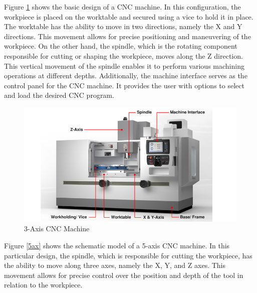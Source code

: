 Figure \ref{3ax} shows the basic design of a \acrshort{CNC} machine. In this configuration, the workpiece is placed on the worktable and secured using a vice to hold it in place. The worktable has the ability to move in two directions, namely the X and Y directions. This movement allows for precise positioning and maneuvering of the workpiece. On the other hand, the spindle, which is the rotating component responsible for cutting or shaping the workpiece, moves along the Z direction. This vertical movement of the spindle enables it to perform various machining operations at different depths. Additionally, the machine interface serves as the control panel for the \acrshort{CNC} machine. It provides the user with options to select and load the desired \acrshort{CNC} program. %




 
\begin{figure}[H]
	\centerline{\includegraphics[scale=.6]{figures/basicCNC.jpg}}
	\caption{3-Axis CNC Machine~\cite{3ax}}
	\label{3ax}
\end{figure}
\newpage


Figure \ref{5ax} shows the schematic model of a 5-axis \acrshort{CNC} machine. In this particular design, the spindle, which is responsible for cutting the workpiece, has the ability to move along three axes, namely the X, Y, and Z axes. This movement allows for precise control over the position and depth of the tool in relation to the workpiece.

